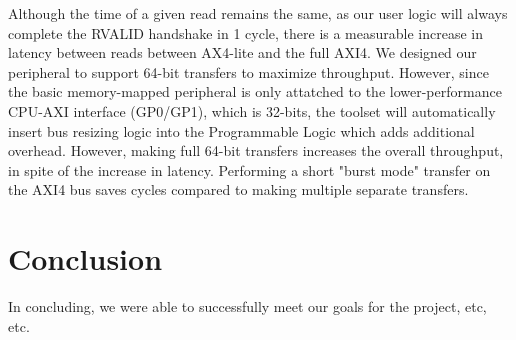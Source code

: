 \documentclass[journal]{IEEEtran}
\begin{document}
Although the time of a given read remains the same, as our user logic will always complete the RVALID handshake in 1 cycle, there is a measurable increase in latency between reads between AX4-lite and the full AXI4. We designed our peripheral to support 64-bit transfers to maximize throughput. However, since the basic memory-mapped peripheral is only attatched to the lower-performance CPU-AXI interface (GP0/GP1), which is 32-bits, the toolset will automatically insert bus resizing logic into the Programmable Logic which adds additional overhead. However, making full 64-bit transfers increases the overall throughput, in spite of the increase in latency. Performing a short "burst mode" transfer on the AXI4 bus saves cycles compared to making multiple separate transfers. 

\section{Conclusion}

In concluding, we were able to successfully meet our goals for the project, etc, etc.  






\end{document}
